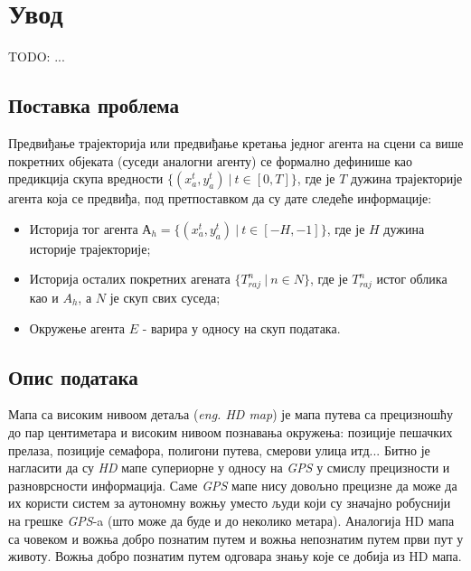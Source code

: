 \documentclass[11pt,oneside]{memoir}
\begin{document}
\frontmatter
\naslovna
\komisija
\apstrakt
\tableofcontents*

\mainmatter

\chapter{Увод}

TODO: ...

\section{Поставка проблема}

Предвиђање трајекторија или предвиђање кретања једног агента на сцени са више покретних објеката (суседи аналогни агенту) се формално
дефинише као предикција скупа вредности $\{(x^{t}_a, y^{t}_a)\ |\ t \in [0, T]\}$, где је $T$ дужина трајекторије агента која се предвиђа, 
под претпоставком да су дате следеће информације:
\begin{itemize}
  \item Историја тог агента $А_{h} = \{(x^{t}_a, y^{t}_a)\ |\ t \in [-H, -1]\}$, где је $H$ дужина историје трајекторије;
  \item Историја осталих покретних агената $\{T^{n}_{raj}\ |\ n \in N\}$, где је $T^{n}_{raj}$ истог облика као и $A_{h}$, а $N$ је скуп
        свих суседа;
  \item Окружење агента $E$ - варира у односу на скуп података.
\end{itemize}

\section{Опис података}

Мапа са високим нивоом детаља (\textit{eng. HD map}) је мапа путева са прецизношћу до пар центиметара и високим нивоом
познавања окружења: позиције пешачких прелаза, позиције семафора, полигони путева, смерови улица итд... Битно је нагласити
да су \textit{HD} мапе супериорне у односу на \textit{GPS} у смислу прецизности и разноврсности информација. Саме \textit{GPS}
мапе нису довољно прецизне да може да их користи систем за аутономну вожњу уместо људи који су значајно робуснији на грешке
\textit{GPS}-a (што може да буде и до неколико метара). Аналогија HD мапа са човеком и вожња добро познатим путем и вожња 
непознатим путем први пут у животу. Вожња добро познатим путем одговара знању које се добија из HD мапа. 
\end{document}
